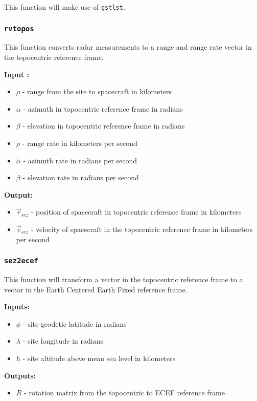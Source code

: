 \documentclass[11pt, reqno]{article}    %
\begin{document}
This function will make use of \texttt{gstlst}.

\subsubsection*{\texttt{rvtopos}}
This function converts radar measurements to a range and range rate vector in the topocentric reference frame.

\noindent \textbf{Input : }
\begin{itemize}
    \item \( \rho \) - range from the site to spacecraft in kilometers
    \item \( \alpha \) - azimuth in topocentric reference frame in radians
    \item \( \beta \) - elevation in topocentric reference frame in radians 
    \item \( \dot{\rho} \) - range rate in kilometers per second
    \item \( \dot{\alpha} \) - azimuth rate in radians per second
    \item \( \dot{\beta} \) - elevation rate in radians per second
\end{itemize}

\noindent \textbf{Output: }

\begin{itemize}
    \item \( \vec r_{sez} \) - position of spacecraft in topocentric reference frame in kilometers
    \item \( \vec v_{sez} \) - velocity of spacecraft in the topocentric reference frame in kilometers per second
\end{itemize}

\subsubsection*{\texttt{sez2ecef}}
This function will transform a vector in the topocentric reference frame to a vector in the Earth Centered Earth Fixed reference frame.

\noindent\textbf{Inputs:}
\begin{itemize}
    \item \( \phi \) - site geodetic latitude in radians
    \item \( \lambda \) - site longitude in radians
    \item \( h \) - site altitude above mean sea level in kilometers
\end{itemize}

\noindent \textbf{Outputs:}
\begin{itemize}
    \item \( R\) - rotation matrix from the topocentric to ECEF reference frame
\end{itemize}
\end{document}
